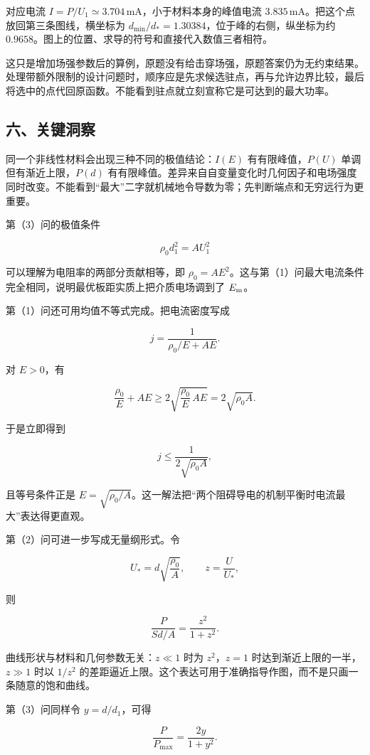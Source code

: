 \documentclass[12pt,a4paper,UTF8]{ctexart}
\begin{document}
对应电流 \(I=P/U_1\simeq3.704\,\mathrm{mA}\)，小于材料本身的峰值电流
\(3.835\,\mathrm{mA}\)。把这个点放回第三条图线，横坐标为
\(d_{\min}/d_*=1.30384\)，位于峰的右侧，纵坐标为约
\(0.9658\)。图上的位置、求导的符号和直接代入数值三者相符。

这只是增加场强参数后的算例，原题没有给击穿场强，原题答案仍为无约束结果。处理带额外限制的设计问题时，顺序应是先求候选驻点，再与允许边界比较，最后将选中的点代回原函数。不能看到驻点就立刻宣称它是可达到的最大功率。

\subsection{六、关键洞察}\label{ux516dux5173ux952eux6d1eux5bdf-1}

同一个非线性材料会出现三种不同的极值结论：\(I(E)\) 有有限峰值，\(P(U)\)
单调但有渐近上限，\(P(d)\)
有有限峰值。差异来自自变量变化时几何因子和电场强度同时改变。不能看到``最大''二字就机械地令导数为零；先判断端点和无穷远行为更重要。

第（3）问的极值条件

\[
\rho_0d_1^2=AU_1^2
\]

可以理解为电阻率的两部分贡献相等，即
\(\rho_0=AE^2\)。这与第（1）问最大电流条件完全相同，说明最优板距实质上把介质电场调到了
\(E_{\rm m}\)。

第（1）问还可用均值不等式完成。把电流密度写成

\[
j=\frac1{\rho_0/E+AE}.
\]

对 \(E>0\)，有

\[
\frac{\rho_0}{E}+AE
\geq2\sqrt{\frac{\rho_0}{E}\,AE}
=2\sqrt{\rho_0A}.
\]

于是立即得到

\[
j\leq\frac1{2\sqrt{\rho_0A}},
\]

且等号条件正是
\(E=\sqrt{\rho_0/A}\)。这一解法把``两个阻碍导电的机制平衡时电流最大''表达得更直观。

第（2）问可进一步写成无量纲形式。令

\[
U_*=d\sqrt{\frac{\rho_0}{A}},
\qquad
z=\frac{U}{U_*},
\]

则

\[
\frac{P}{Sd/A}=\frac{z^2}{1+z^2}.
\]

曲线形状与材料和几何参数无关：\(z\ll1\) 时为 \(z^2\)，\(z=1\)
时达到渐近上限的一半，\(z\gg1\) 时以 \(1/z^2\)
的差距逼近上限。这个表达可用于准确指导作图，而不是只画一条随意的饱和曲线。

第（3）问同样令 \(y=d/d_1\)，可得

\[
\frac{P}{P_{\max}}=\frac{2y}{1+y^2}.
\]
\end{document}
